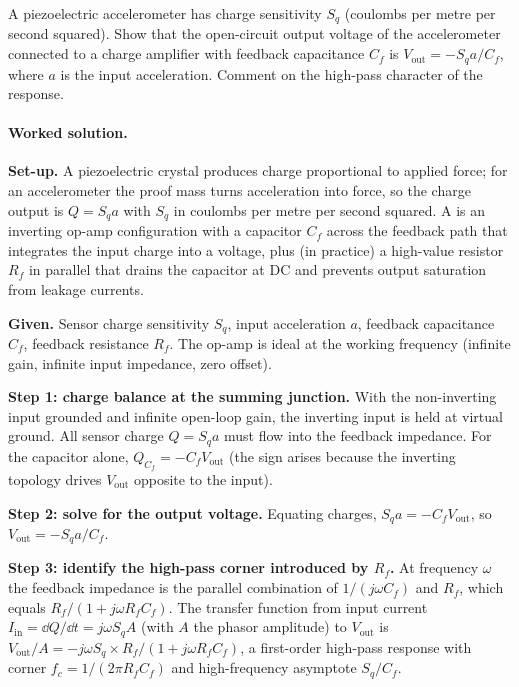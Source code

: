 \begin{exercise}
A piezoelectric accelerometer has charge sensitivity $S_{q}$
(coulombs per metre per second squared). Show that the open-circuit
output voltage of the accelerometer connected to a charge
amplifier with feedback capacitance $C_{f}$ is
$V_{\text{out}} = -S_{q} a / C_{f}$, where $a$ is the input
acceleration. Comment on the high-pass character of the response.
\end{exercise}

\paragraph{Worked solution.}
\textbf{Set-up.} A piezoelectric crystal produces charge
proportional to applied force; for an accelerometer the proof mass
turns acceleration into force, so the charge output is
$Q = S_{q} a$ with $S_{q}$ in coulombs per metre per second
squared. A  is an inverting op-amp
configuration with a capacitor $C_{f}$ across the feedback path
that integrates the input charge into a voltage, plus (in
practice) a high-value resistor $R_{f}$ in parallel that drains
the capacitor at DC and prevents output saturation from leakage
currents.

\textbf{Given.} Sensor charge sensitivity $S_{q}$, input
acceleration $a$, feedback capacitance $C_{f}$, feedback
resistance $R_{f}$. The op-amp is ideal at the working frequency
(infinite gain, infinite input impedance, zero offset).

\textbf{Step 1: charge balance at the summing junction.} With the
non-inverting input grounded and infinite open-loop gain, the
inverting input is held at virtual ground. All sensor charge
$Q = S_{q} a$ must flow into the feedback impedance. For the
capacitor alone, $Q_{C_{f}} = -C_{f} V_{\text{out}}$ (the sign
arises because the inverting topology drives $V_{\text{out}}$
opposite to the input).

\textbf{Step 2: solve for the output voltage.} Equating charges,
$S_{q} a = -C_{f} V_{\text{out}}$, so
$V_{\text{out}} = -S_{q} a / C_{f}$.

\textbf{Step 3: identify the high-pass corner introduced by
$R_{f}$.} At frequency $\omega$ the feedback impedance is the
parallel combination of $1/(j\omega C_{f})$ and $R_{f}$, which
equals $R_{f}/(1 + j\omega R_{f} C_{f})$. The transfer function
from input current $I_{\text{in}} = \dd Q/\dd t = j\omega S_{q}
A$ (with $A$ the phasor amplitude) to $V_{\text{out}}$ is
$V_{\text{out}}/A = -j\omega S_{q} \times R_{f}/(1 + j\omega R_{f}
C_{f})$, a first-order high-pass response with corner $f_{c} = 1/
(2\pi R_{f} C_{f})$ and high-frequency asymptote $S_{q}/C_{f}$.

